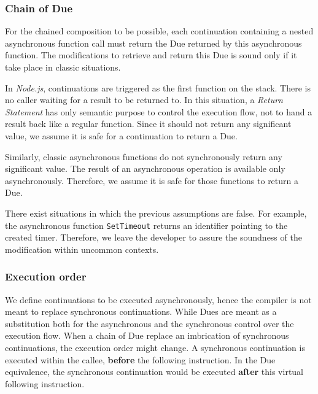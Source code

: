 \subsubsection{Chain of Due}

For the chained composition to be possible, each continuation containing a nested asynchronous function call must return the Due returned by this asynchronous function.
The modifications to retrieve and return this Due is sound only if it take place in classic situations.

In \textit{Node.js}, continuations are triggered as the first function on the stack.
There is no caller waiting for a result to be returned to.
In this situation, a \textit{Return Statement} has only semantic purpose to control the execution flow, not to hand a result back like a regular function.
Since it should not return any significant value, we assume it is safe for a continuation to return a Due.

Similarly, classic asynchronous functions do not synchronously return any significant value.
The result of an asynchronous operation is available only asynchronously.
Therefore, we assume it is safe for those functions to return a Due.

There exist situations in which the previous assumptions are false.
For example, the asynchronous function \texttt{SetTimeout} returns an identifier pointing to the created timer.
Therefore, we leave the developer to assure the soundness of the modification within uncommon contexts.

\subsubsection{Execution order}

We define continuations to be executed asynchronously, hence the compiler is not meant to replace synchronous continuations.
While Dues are meant as a substitution both for the asynchronous and the synchronous control over the execution flow.
When a chain of Due replace an imbrication of synchronous continuations, the execution order might change.
A synchronous continuation is executed within the callee, \textbf{before} the following instruction.
In the Due equivalence, the synchronous continuation would be executed \textbf{after} this virtual following instruction.




